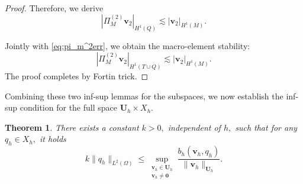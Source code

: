 \documentclass[a4paper,11pt,fleqn]{article}
\newtheorem{theorem}{Theorem}[section]
\numberwithin{equation}{section}
\begin{document}
\begin{proof}
	Therefore, we derive 
	\begin{equation}\label{eq:pi_M^2TQerr}
		|\Pi^{(2)}_M \boldsymbol{v}_2|_{H^1(Q)} \lesssim |\boldsymbol{v}_2|_{H^1(M)}.
	\end{equation}
	
	Jointly with \eqref{eq:pi_m^2err}, we obtain the macro-element stability:
	\begin{equation}\label{eq:pi_M^2TQ1err}
		|\Pi^{(2)}_M \boldsymbol{v}_2|_{H^1(T \cup Q)} \lesssim |\boldsymbol{v}_2|_{H^1(M)}.
	\end{equation}
	The proof completes by Fortin trick.
\end{proof}

Combining these two inf-sup lemmas for the subspaces, we now establish the inf-sup condition for the full space $\bm{U}_h\times X_h$.
\begin{theorem}\label{th:qhsup}
	There exists a constant $k>0,$ independent of $h,$ such that for any $q_{h}\in X_{h},$ it holds
	\begin{equation}\label{eq:infsup}
		k\| q_h \|_{L^2(\Omega)} \leq \sup_{\substack{\boldsymbol{v}_h \in \boldsymbol{U}_h \\ \boldsymbol{v}_h \neq \boldsymbol{0}}} \frac{b_h(\boldsymbol{v}_h,q_h)}{\|\boldsymbol{v}_h\|_{\boldsymbol{U}_h}}.
	\end{equation}
\end{theorem}
\end{document}
